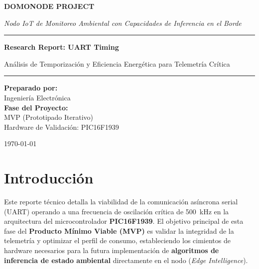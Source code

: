 \documentclass[11pt,a4paper]{article}
\begin{document}
\begin{titlepage}
    \centering
    \vspace*{1cm}
    {\color{DomoBlue}\Huge\textbf{DOMONODE PROJECT}\par}
    \vspace{0.5cm}
    {\Large\textit{Nodo IoT de Monitoreo Ambiental con Capacidades de Inferencia en el Borde}\par}
    
    \vspace{2cm}
    \hrule
    \vspace{0.8cm}
    {\huge\textbf{Research Report: UART Timing}\par}
    \vspace{0.3cm}
    {\large Análisis de Temporización y Eficiencia Energética para Telemetría Crítica\par}
    \vspace{0.8cm}
    \hrule
    
    \vspace{2cm}
    \textbf{Preparado por:}\\
    Ingeniería Electrónica\\
    
    \vspace{1cm}
    \textbf{Fase del Proyecto:}\\
    MVP (Prototipado Iterativo)\\
    Hardware de Validación: PIC16F1939
    
    \vfill
    \vspace{1cm}
    
    {\large \today \par}
\end{titlepage}

\newpage
\thispagestyle{fancy}

\section{Introducción}
Este reporte técnico detalla la viabilidad de la comunicación asíncrona serial (UART) operando a una frecuencia de oscilación crítica de \SI{500}{\kilo\hertz} en la arquitectura del microcontrolador \textbf{PIC16F1939}. El objetivo principal de esta fase del \textbf{Producto Mínimo Viable (MVP)} es validar la integridad de la telemetría y optimizar el perfil de consumo, estableciendo los cimientos de hardware necesarios para la futura implementación de \textbf{algoritmos de inferencia de estado ambiental} directamente en el nodo (\textit{Edge Intelligence}).
\end{document}
